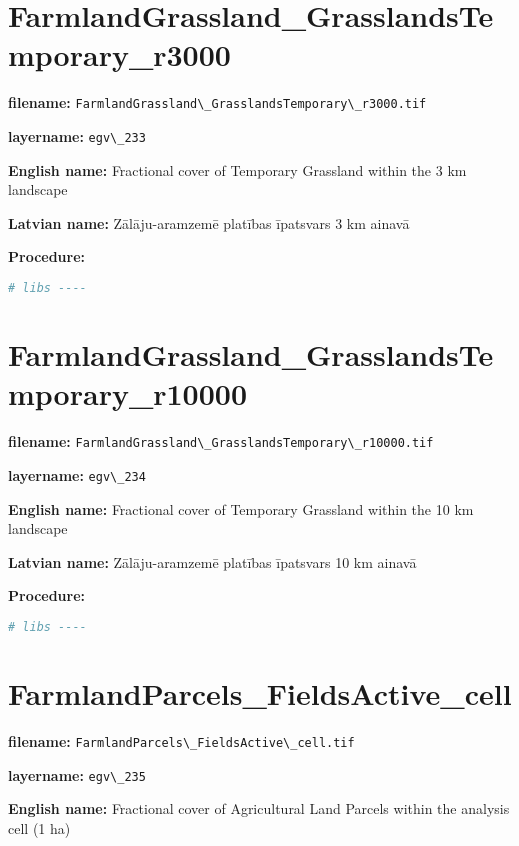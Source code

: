 \documentclass[
]{book}
\newcommand{\passthrough}[1]{#1}
\begin{document}
\section{FarmlandGrassland\_GrasslandsTemporary\_r3000}\label{ch06.233}

\textbf{filename:} \passthrough{\lstinline!FarmlandGrassland\_GrasslandsTemporary\_r3000.tif!}

\textbf{layername:} \passthrough{\lstinline!egv\_233!}

\textbf{English name:} Fractional cover of Temporary Grassland within the 3 km landscape

\textbf{Latvian name:} Zālāju-aramzemē platības īpatsvars 3 km ainavā

\textbf{Procedure:}

\begin{lstlisting}[language=R]
# libs ----
\end{lstlisting}

\section{FarmlandGrassland\_GrasslandsTemporary\_r10000}\label{ch06.234}

\textbf{filename:} \passthrough{\lstinline!FarmlandGrassland\_GrasslandsTemporary\_r10000.tif!}

\textbf{layername:} \passthrough{\lstinline!egv\_234!}

\textbf{English name:} Fractional cover of Temporary Grassland within the 10 km landscape

\textbf{Latvian name:} Zālāju-aramzemē platības īpatsvars 10 km ainavā

\textbf{Procedure:}

\begin{lstlisting}[language=R]
# libs ----
\end{lstlisting}

\section{FarmlandParcels\_FieldsActive\_cell}\label{ch06.235}

\textbf{filename:} \passthrough{\lstinline!FarmlandParcels\_FieldsActive\_cell.tif!}

\textbf{layername:} \passthrough{\lstinline!egv\_235!}

\textbf{English name:} Fractional cover of Agricultural Land Parcels within the analysis cell (1 ha)
\end{document}
